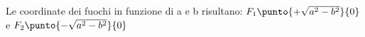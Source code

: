 \begin{description}

Le coordinate dei fuochi in funzione di a e b risultano:
\(F_{1} \punto{+\sqrt{a^{2}-b^{2}}}{0}\) e 
\(F_{2} \punto{-\sqrt{a^{2}-b^{2}}}{0}\)


\end{description}
